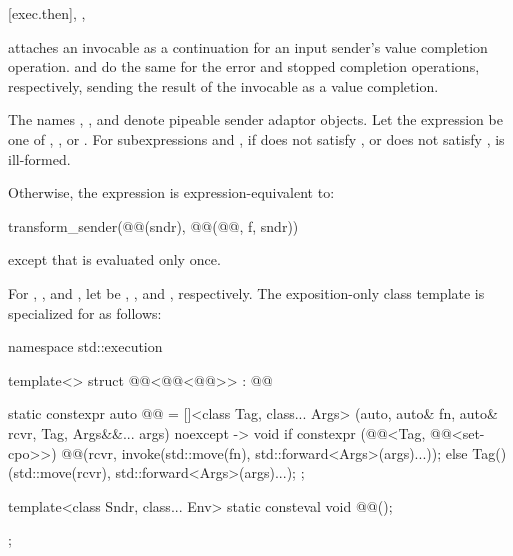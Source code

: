 [exec.then]{, , }

\pnum
{} attaches an invocable as a continuation
for an input sender's value completion operation.
 and  do the same
for the error and stopped completion operations, respectively,
sending the result of the invocable as a value completion.

\pnum
The names , , and 
denote pipeable sender adaptor objects.
Let the expression  be one of
, , or .
For subexpressions  and ,
if  does not satisfy , or
 does not satisfy ,
is ill-formed.

\pnum
Otherwise,
the expression  is expression-equivalent to:
\begin{codeblock}
transform_sender(@@(sndr), @@(@@, f, sndr))
\end{codeblock}
except that  is evaluated only once.

\pnum
For , , and ,
let  be
, , and , respectively.
The exposition-only class template 
is specialized for  as follows:
\begin{codeblock}
namespace std::execution {
  template<>
  struct @@<@@<@@>> : @@ {
    static constexpr auto @@ =
      []<class Tag, class... Args>
        (auto, auto& fn, auto& rcvr, Tag, Args&&... args) noexcept -> void {
          if constexpr (@@<Tag, @@<set-cpo>>) {
            @@(rcvr,
                          invoke(std::move(fn), std::forward<Args>(args)...));
          } else {
            Tag()(std::move(rcvr), std::forward<Args>(args)...);
          }
        };

    template<class Sndr, class... Env>
      static consteval void @@();
  };
}
\end{codeblock}

